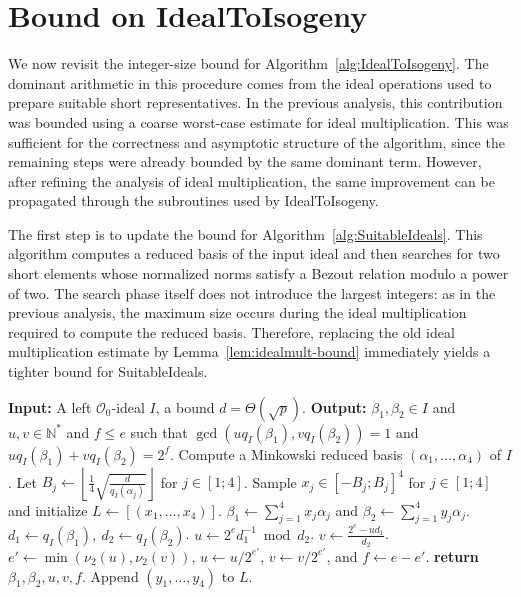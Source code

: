 \section{Bound on IdealToIsogeny}
\label{sec:idealtoisogeny}

We now revisit the integer-size bound for
Algorithm~\ref{alg:IdealToIsogeny}.  The dominant arithmetic in this procedure
comes from the ideal operations used to prepare suitable short representatives.
In the previous analysis, this contribution was bounded using a coarse
worst-case estimate for ideal multiplication.  This was sufficient for the
correctness and asymptotic structure of the algorithm, since the remaining steps
were already bounded by the same dominant term.  However, after refining the
analysis of ideal multiplication, the same improvement can be propagated through
the subroutines used by \textsf{IdealToIsogeny}.

The first step is to update the bound for
Algorithm~\ref{alg:SuitableIdeals}.  This algorithm computes a reduced basis of
the input ideal and then searches for two short elements whose normalized norms
satisfy a Bezout relation modulo a power of two.  The search phase itself does
not introduce the largest integers: as in the previous analysis, the maximum
size occurs during the ideal multiplication required to compute the reduced
basis.  Therefore, replacing the old ideal multiplication estimate by
Lemma~\ref{lem:idealmult-bound} immediately yields a tighter bound for
\textsf{SuitableIdeals}.

\begin{algorithm}
\caption{SuitableIdeals$(I)$.}\label{alg:SuitableIdeals}
  \begin{algorithmic}[1]
    \Statex \textbf{Input:} A left $\mathcal{O}_0$-ideal $I$, a bound $d=\Theta(\sqrt{p})$.
    \Statex \textbf{Output:} $\beta_1,\beta_2\in I$ and $u,v\in\mathbb{N}^*$ and $f\le e$ such that $\gcd(u q_I(\beta_1),v q_I(\beta_2))=1$ and $u q_I(\beta_1)+v q_I(\beta_2)=2^f$.
    \State Compute a Minkowski reduced basis $(\alpha_1,\dots,\alpha_4)$ of $I$.
    \State Let $B_j\leftarrow \left\lfloor \frac{1}{4}\sqrt{\frac{d}{q_I(\alpha_j)}}\right\rfloor$ for $j\in[1;4]$.
    \State Sample $x_j\in [-B_j;B_j]^4$ for $j\in[1;4]$ and initialize $L\leftarrow [(x_1,\dots,x_4)]$.
        \State $\beta_1\leftarrow \sum_{j=1}^4 x_j\alpha_j$ and $\beta_2\leftarrow \sum_{j=1}^4 y_j\alpha_j$.
        \State $d_1\leftarrow q_I(\beta_1),\ d_2\leftarrow q_I(\beta_2)$.
          \State $u\leftarrow 2^{e} d_1^{-1}\bmod d_2$.
          \State $v\leftarrow \frac{2^{e}-u d_1}{d_2}$.
            \State $e'\leftarrow \min(\nu_2(u),\nu_2(v))$, $u\leftarrow u/2^{e'}$, $v\leftarrow v/2^{e'}$, and $f\leftarrow e-e'$.
            \State \textbf{return} $\beta_1,\beta_2,u,v,f$.
          \Else
            \State Append $(y_1,\dots,y_4)$ to $L$.
          \EndIf
        \EndIf
      \EndFor
    \EndFor
  \end{algorithmic}
\end{algorithm}

